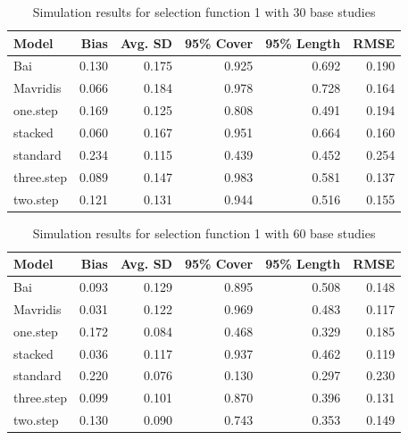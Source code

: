 \documentclass[12pt]{article}   	%
\numberwithin{equation}{section}
\begin{document}

\begin{table}[ht]
\centering
\begin{tabular}{lrrrrr}
  \hline
Model & Bias & Avg. SD & 95\% Cover & 95\% Length & RMSE \\ 
  \hline
Bai & 0.130 & 0.175 & 0.925 & 0.692 & 0.190 \\ 
  Mavridis & 0.066 & 0.184 & 0.978 & 0.728 & 0.164 \\ 
  one.step & 0.169 & 0.125 & 0.808 & 0.491 & 0.194 \\ 
  stacked & 0.060 & 0.167 & 0.951 & 0.664 & 0.160 \\ 
  standard & 0.234 & 0.115 & 0.439 & 0.452 & 0.254 \\ 
  three.step & 0.089 & 0.147 & 0.983 & 0.581 & 0.137 \\ 
  two.step & 0.121 & 0.131 & 0.944 & 0.516 & 0.155 \\ 
   \hline
\end{tabular}
\caption{Simulation results for selection function 1 with 30 base studies}
\end{table}

\begin{table}[ht]
\centering
\begin{tabular}{lrrrrr}
  \hline
Model & Bias & Avg. SD & 95\% Cover & 95\% Length & RMSE \\ 
  \hline
Bai & 0.093 & 0.129 & 0.895 & 0.508 & 0.148 \\ 
  Mavridis & 0.031 & 0.122 & 0.969 & 0.483 & 0.117 \\ 
  one.step & 0.172 & 0.084 & 0.468 & 0.329 & 0.185 \\ 
  stacked & 0.036 & 0.117 & 0.937 & 0.462 & 0.119 \\ 
  standard & 0.220 & 0.076 & 0.130 & 0.297 & 0.230 \\ 
  three.step & 0.099 & 0.101 & 0.870 & 0.396 & 0.131 \\ 
  two.step & 0.130 & 0.090 & 0.743 & 0.353 & 0.149 \\ 
   \hline
\end{tabular}
\caption{Simulation results for selection function 1 with 60 base studies}
\end{table}



\end{document}
